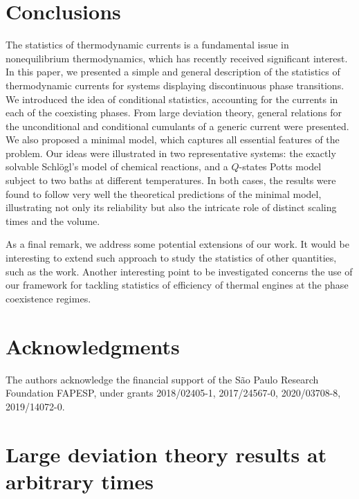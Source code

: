 \documentclass[aps,pre,reprint, amsmath, amssymb,superscriptaddress]{revtex4-1}
\begin{document}
\section{\label{sec:conc}Conclusions}
The statistics of thermodynamic currents is
a fundamental issue in nonequilibrium thermodynamics, which has recently received significant interest. 
In this paper, we presented a simple and general description of the statistics of thermodynamic currents for systems displaying
discontinuous phase transitions. 
We introduced the idea of conditional statistics, accounting for the currents in each of the coexisting phases.
From large deviation theory, general relations for the unconditional and conditional cumulants of
a generic current were presented. We also proposed a minimal model, which captures all essential features of the problem. 
Our ideas were illustrated in two representative
systems: the exactly solvable 
Schl\"ogl's model of chemical reactions, and a  $Q$-states Potts model subject to two baths at different temperatures. 
In both cases, the results were found to follow very well the theoretical predictions of the minimal model, illustrating not only its reliability
but also the intricate role of distinct scaling times
and the volume.


As a final remark, we address some potential extensions of our work. It would be interesting to extend such approach to study the statistics of other quantities, such as the work. Another interesting point to be investigated concerns the use of our framework for tackling statistics of efficiency of thermal engines at the phase coexistence regimes.



\section*{Acknowledgments}
The authors acknowledge the financial support of the S\~ao Paulo Research Foundation FAPESP, under grants 
2018/02405-1,
2017/24567-0, 2020/03708-8, 
2019/14072-0. 




\appendix
\section{\label{app:ldt} Large deviation theory results at arbitrary times}
\end{document}
